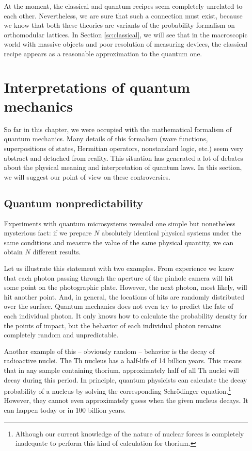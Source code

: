 \documentclass[nochecklpage]{stefan1}
\theoremstyle{definition}
\begin{document}
%
At the moment, the classical and quantum recipes seem completely
unrelated to each other. Nevertheless, we are sure that such a
connection must exist, because we know that both these theories are
variants of the probability formalism on orthomodular lattices. In
Section \ref{sc:classical}, we will see that in the macroscopic world
with massive objects and poor resolution of measuring devices, the
classical recipe appears as a reasonable approximation to the quantum
one.

\section{Interpretations of quantum mechanics}\label{sc:complete}
So far in this chapter, we were occupied with the mathematical formalism
of quantum mechanics. Many details of this formalism (wave functions,
superpositions of states, Hermitian operators, nonstandard logic, etc.)
seem very abstract and detached from reality. This situation has
generated a lot of debates about the physical meaning and interpretation
of quantum laws. In this section, we will suggest our point of view on
these controversies.

\subsection{Quantum nonpredictability}\label{ss:unpredictability}
Experiments with quantum microsystems revealed one simple but
nonetheless mysterious fact: if we prepare $ N $ absolutely identical
physical systems under the same conditions and measure the value of the
same physical quantity, we can obtain $ N $ different results.

Let us illustrate this statement with two examples. From experience we
know that each photon passing through the aperture of the pinhole camera
will hit some point on the photographic plate. However, the next photon,
most likely, will hit another point. And, in general, the locations of
hits are randomly distributed over the surface. Quantum mechanics does
not even try to predict the fate of each individual photon. It only
knows how to calculate the probability density for the points of impact,
but the behavior of each individual photon remains completely random and
unpredictable.

Another example of this -- obviously random -- behavior is the decay of
radioactive nuclei. The Th  nucleus has a half-life of 14
billion years. This means that in any sample containing thorium,
approximately half of all Th  nuclei will decay during this
period. In principle, quantum physicists can calculate the decay
probability of a nucleus by solving the corresponding Schr\"{o}dinger
equation.\footnote{Although our current knowledge of the nature of
nuclear forces is completely inadequate
to perform this kind of calculation for thorium.} However, they cannot
even approximately guess when the given nucleus decays. It can happen
today or in 100 billion years.
\end{document}
